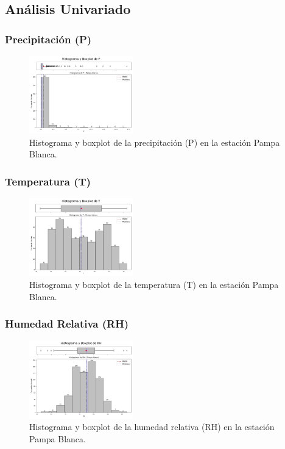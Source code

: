 \subsection{Análisis Univariado}

\subsubsection*{Precipitación (P)}
\begin{figure}[H]
\centering
\includegraphics[width=0.4\textwidth]{resultados/por_estacion_meteorologica/Pampa_Blanca/P_histograma.png}
\caption{Histograma y boxplot de la precipitación (P) en la estación Pampa Blanca.}
\label{fig:pampablanca_P}
\end{figure}

\subsubsection*{Temperatura (T)}
\begin{figure}[H]
\centering
\includegraphics[width=0.4\textwidth]{resultados/por_estacion_meteorologica/Pampa_Blanca/T_histograma.png}
\caption{Histograma y boxplot de la temperatura (T) en la estación Pampa Blanca.}
\label{fig:pampablanca_T}
\end{figure}

\subsubsection*{Humedad Relativa (RH)}
\begin{figure}[H]
\centering
\includegraphics[width=0.4\textwidth]{resultados/por_estacion_meteorologica/Pampa_Blanca/RH_histograma.png}
\caption{Histograma y boxplot de la humedad relativa (RH) en la estación Pampa Blanca.}
\label{fig:pampablanca_RH}
\end{figure}

